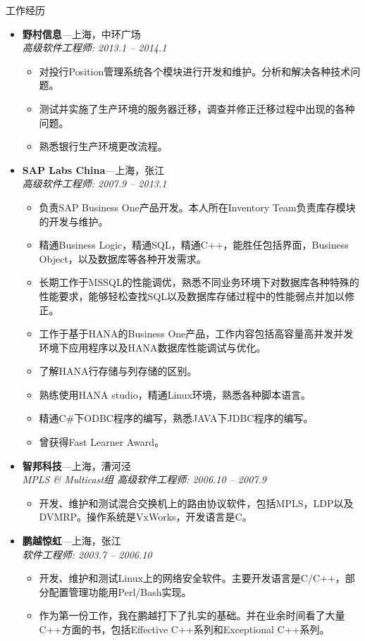 \documentclass[11pt,oneside]{article}
\newenvironment{ressection}[1]{
    \vspace{4pt}
    {\selectfont\Large#1}
    \begin{itemize}
    \vspace{3pt}
}{
    \end{itemize}
}
\newcommand{\ressubitem}[1]{
    \vspace{-1pt}
    \item \begin{flushleft} #1 \end{flushleft}
}
\newcommand{\resbigitem}[3]{
    \vspace{-5pt}
    \item
    \textbf{#1}---#2 \\
    \textit{#3}
}
\newenvironment{ressubsec}[3]{
    \resbigitem{#1}{#2}{#3}
    \vspace{-2pt}
    \begin{itemize}
}{
    \end{itemize}
}
\begin{document}
\begin{ressection}{工作经历}

	\begin{ressubsec}{野村信息}{上海，中环广场}{高级软件工程师: 2013.1 -- 2014.1}
        \ressubitem{对投行Position管理系统各个模块进行开发和维护。分析和解决各种技术问题。}
		\ressubitem{测试并实施了生产环境的服务器迁移，调查并修正迁移过程中出现的各种问题。}
		\ressubitem{熟悉银行生产环境更改流程。}
    \end{ressubsec}

    \begin{ressubsec}{SAP Labs China}{上海，张江}{高级软件工程师: 2007.9 -- 2013.1}
        \ressubitem{负责SAP Business One产品开发。本人所在Inventory Team负责库存模块的开发与维护。}
		\ressubitem{精通Business Logic，精通SQL，精通C++，能胜任包括界面，Business Object，以及数据库等各种开发需求。}
        \ressubitem{长期工作于MSSQL的性能调优，熟悉不同业务环境下对数据库各种特殊的性能要求，能够轻松查找SQL以及数据库存储过程中的性能弱点并加以修正。}
        \ressubitem{工作于基于HANA的Business One产品，工作内容包括高容量高并发并发环境下应用程序以及HANA数据库性能调试与优化。}
        \ressubitem{了解HANA行存储与列存储的区别。}
		\ressubitem{熟练使用HANA studio，精通Linux环境，熟悉各种脚本语言。}
        \ressubitem{精通C\#下ODBC程序的编写，熟悉JAVA下JDBC程序的编写。}
		\ressubitem{曾获得Fast Learner Award。}
    \end{ressubsec}

    \begin{ressubsec}{智邦科技}{上海，漕河泾}{MPLS \& Multicast组 高级软件工程师: 2006.10 -- 2007.9}
        \ressubitem{开发、维护和测试混合交换机上的路由协议软件，包括MPLS，LDP以及DVMRP。操作系统是VxWorks，开发语言是C。}
    \end{ressubsec}

    \begin{ressubsec}{鹏越惊虹}{上海，张江}{软件工程师: 2003.7 -- 2006.10}
        \ressubitem{开发、维护和测试Linux上的网络安全软件。主要开发语言是C/C++，部分配置管理功能用Perl/Bash实现。}
        \ressubitem{作为第一份工作，我在鹏越打下了扎实的基础。并在业余时间看了大量C++方面的书，包括Effective C++系列和Exceptional C++系列。}
    \end{ressubsec}

\end{ressection}
\end{document}
